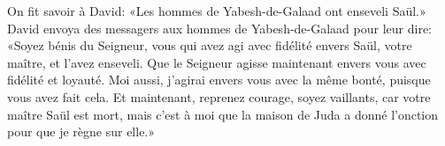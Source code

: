 On fit savoir à David: «Les hommes de Yabesh-de-Galaad ont enseveli Saül.»
David envoya des messagers aux hommes de Yabesh-de-Galaad pour leur dire:
	«Soyez bénis du Seigneur,
	vous qui avez agi avec fidélité envers Saül, votre maître, et l’avez enseveli.
Que le Seigneur agisse maintenant envers vous avec fidélité et loyauté.
Moi aussi, j’agirai envers vous avec la même bonté, puisque vous avez fait cela.
Et maintenant, reprenez courage, soyez vaillants,
	car votre maître Saül est mort,
	mais c’est à moi que la maison de Juda a donné l’onction pour que je règne sur elle.»
